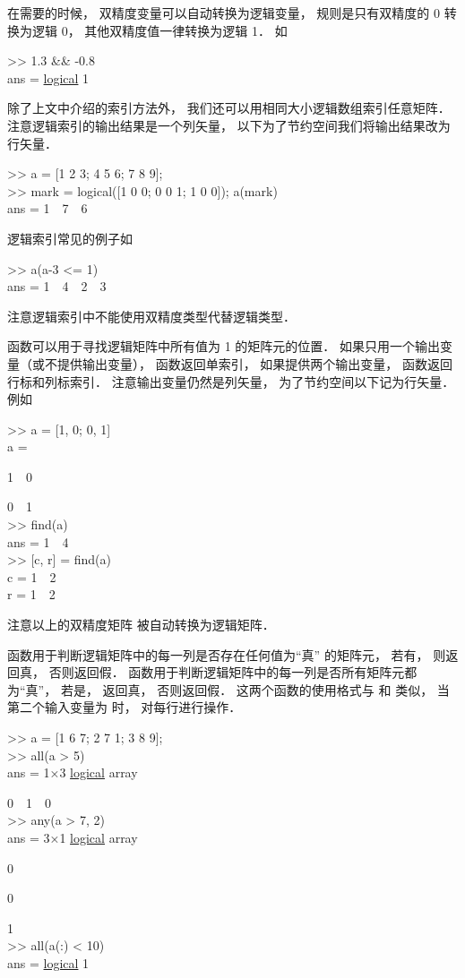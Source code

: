 在需要的时候， 双精度变量可以自动转换为逻辑变量， 规则是只有双精度的 0 转换为逻辑 0， 其他双精度值一律转换为逻辑 1． 如
\begin{Command}
>> 1.3 \&\& -0.8 \\
ans = {\color{blue}\underline{logical}} 1
\end{Command}

除了上文中介绍的索引方法外， 我们还可以用相同大小逻辑数组索引任意矩阵． 注意逻辑索引的输出结果是一个列矢量， 以下为了节约空间我们将输出结果改为行矢量．
\begin{Command}
>> a = [1 2 3; 4 5 6; 7 8 9]; \\
>> mark = logical([1 0 0; 0 0 1; 1 0 0]); a(mark) \\
ans = 1\ \ 7\ \ 6
\end{Command}
逻辑索引常见的例子如
\begin{Command}
>> a(a-3 <= 1) \\
ans = 1\ \ 4\ \ 2\ \ 3
\end{Command}
注意逻辑索引中不能使用双精度类型代替逻辑类型．

 函数可以用于寻找逻辑矩阵中所有值为 1 的矩阵元的位置． 如果只用一个输出变量（或不提供输出变量）， 函数返回单索引， 如果提供两个输出变量， 函数返回行标和列标索引． 注意输出变量仍然是列矢量， 为了节约空间以下记为行矢量． 例如
\begin{Command}
>> a = [1, 0; 0, 1]\\
a =\par
1\ \ 0\par
0\ \ 1\\
>> find(a)\\
ans = 1\ \ 4\\
>> [c, r] = find(a)\\
c = 1\ \ 2\\
r = 1\ \ 2
\end{Command}
注意以上的双精度矩阵  被自动转换为逻辑矩阵． 

 函数用于判断逻辑矩阵中的每一列是否存在任何值为“真” 的矩阵元， 若有， 则返回真， 否则返回假．  函数用于判断逻辑矩阵中的每一列是否所有矩阵元都为“真”， 若是， 返回真， 否则返回假． 这两个函数的使用格式与  和  类似， 当第二个输入变量为  时， 对每行进行操作．
\begin{Command}
>> a = [1 6 7; 2 7 1; 3 8 9];\\
>> all(a > 5)\\
ans = 1×3 {\color{blue}\underline{logical}} array\par
0\ \ 1\ \ 0\\
>> any(a > 7, 2)\\
ans = 3×1 {\color{blue}\underline{logical}} array\par
0\par 0\par 1\\
>> all(a(:) < 10)\\
ans = {\color{blue}\underline{logical}} 1
\end{Command}

